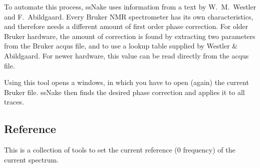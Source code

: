 \documentclass[11pt,a4paper]{article}
\begin{document}


To automate this process, ssNake uses information from a text by W.\ M.\ Westler and F.\ Abildgaard. Every Bruker NMR spectrometer has its own characteristics, and therefore needs a different amount of first order phase correction. For older Bruker hardware, the amount of correction is found by extracting two parameters from the Bruker acqus file, and to use a lookup table supplied by Westler \& Abildgaard. For newer hardware, this value can be read directly from the acqus file.

Using this tool opens a windows, in which you have to open (again) the current Bruker file. ssNake then finds the desired phase correction and applies it to all traces.

\subsection{Reference}
This is a collection of tools to set the current reference (0 frequency) of the current spectrum.
\end{document}
